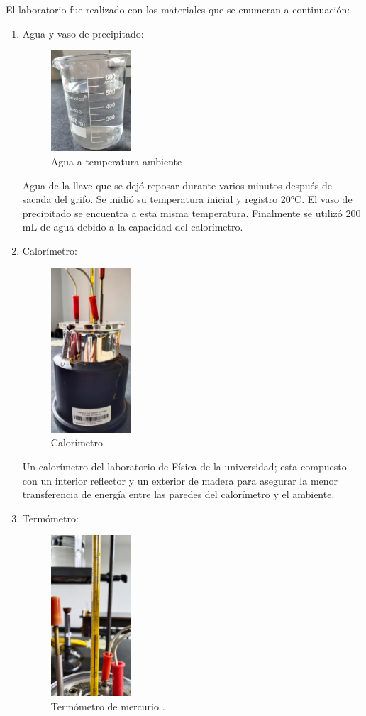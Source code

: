 \documentclass[journal,transmag]{IEEEtran}
\begin{document}
El laboratorio fue realizado con los materiales que se enumeran a continuación:
	\begin{enumerate}
	
  \item Agua y vaso de precipitado:
		\begin{figure}[!h]
			\center
			\includegraphics[width=3cm]{img/agua.jpeg}
			\caption{Agua a temperatura ambiente}
			\label{f1}
		\end{figure}
		
	Agua de la llave que se dejó reposar durante varios minutos después de sacada del grifo. Se midió su temperatura inicial y registro 20°C. El vaso de precipitado se encuentra a esta misma temperatura. Finalmente se utilizó 200 mL de agua debido a la capacidad del calorímetro.
		\vspace{20mm}
  \item Calorímetro:
  \begin{figure}[!h]
			\center
			\includegraphics[width=3cm]{img/calorimetro.jpeg}
			\caption{Calorímetro}
			\label{f3}
		\end{figure}
		
	Un calorímetro del laboratorio de Física de la universidad; esta compuesto con un interior reflector y un exterior de madera para asegurar la menor transferencia de energía entre las paredes del calorímetro y el ambiente. 

  \item Termómetro: 
  \begin{figure}[!h]
			\center
			\includegraphics[width=3cm]{img/termometro.jpeg}
			\caption{Termómetro de mercurio .}
			\label{f2}
		\end{figure}
		

\end{enumerate}
\end{document}
